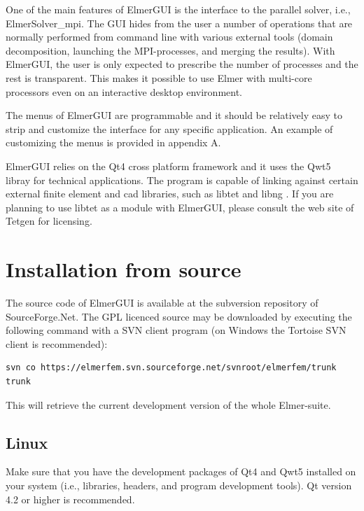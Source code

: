 \documentclass[a4paper,12pt]{article}
\begin{document}
One of the main features of ElmerGUI is the interface to the parallel 
solver, i.e., ElmerSolver\_mpi. The GUI hides from the user a number of operations that
are normally performed from command line with various external tools (domain
decomposition, launching the MPI-processes, and merging the results). With
ElmerGUI, the user is only
expected to prescribe the number of processes and the rest is transparent. This makes
it possible to use Elmer with multi-core processors even on an interactive desktop environment.

The menus of ElmerGUI are programmable and it should be relatively easy to strip and
customize the interface for any specific application. An example of customizing the
menus is provided in appendix A. 

ElmerGUI relies on the Qt4 cross platform framework \cite{QtHome} and it uses the Qwt5 libray \cite{QwtHome} for technical applications. The program is capable of linking against certain external finite element and cad libraries, such as libtet \cite{TetgenHome} and libng \cite{NetgenHome}. If you are planning to use libtet as a module with ElmerGUI, please consult the web site of Tetgen for licensing.

\section{Installation from source}

The source code of ElmerGUI is available at the subversion repository of SourceForge.Net. The GPL licenced source may be downloaded by executing the following command with a SVN client program (on Windows the Tortoise SVN client is recommended):

\begin{footnotesize}
\begin{verbatim}
svn co https://elmerfem.svn.sourceforge.net/svnroot/elmerfem/trunk trunk
\end{verbatim}
\end{footnotesize}
\noindent This will retrieve the current development version of the whole Elmer-suite.

\subsection{Linux}

Make sure that you have the development packages of Qt4 and Qwt5 installed on your system (i.e., libraries, headers, and program development tools). Qt version 4.2 or higher is recommended.
\end{document}
